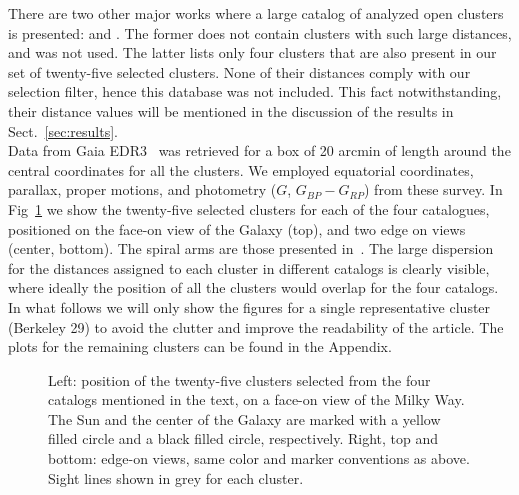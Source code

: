 \documentclass[draft]{aa}
\begin{document}
 There are two other major works where a large catalog of analyzed open clusters
 is presented: \cite{Lui_2019} and \cite{Dias_2021}. The former does not contain
 clusters with such large distances, and was not used. The latter lists
 only four clusters that are also present in our set of twenty-five selected
 clusters. None of their distances comply with our selection filter, hence this
 database was not included. This fact notwithstanding, their distance values will
 be mentioned in the discussion of the results in Sect.~\ref{sec:results}.\\

 Data from Gaia EDR3~\citep{Gaia_2016,Gaia_EDR3} was retrieved for a box of 20
 arcmin of length around the central coordinates for all the clusters. We
 employed equatorial coordinates, parallax, proper motions, and photometry
 ($G$, $G_{BP}-G_{RP}$) from these survey.
 In Fig~\ref{fig:MWmap} we show the twenty-five selected clusters for each of
 the four catalogues, positioned on the face-on view of the Galaxy (top), and
 two edge on views (center, bottom). The spiral arms are those presented
 in~\cite{Momany_2006}. The large dispersion for the distances
 assigned to each cluster in different catalogs is clearly visible, where
 ideally the position of all the clusters would overlap for the four catalogs.\\

 In what follows we will only show the figures for a single representative
 cluster (Berkeley 29) to avoid the clutter and improve the readability of the
 article. The plots for the remaining clusters can be found in the Appendix.

 \begin{figure}
  \caption{Left: position of the twenty-five clusters selected from the four
    catalogs mentioned in the text, on a face-on view of the Milky Way. The Sun
    and the center of the Galaxy are marked with a yellow filled circle and a
    black filled circle, respectively. Right, top and bottom: edge-on views,
    same color and marker conventions as above.
    Sight lines shown in grey for each cluster.}
  \label{fig:MWmap}
 \end{figure}
\end{document}

